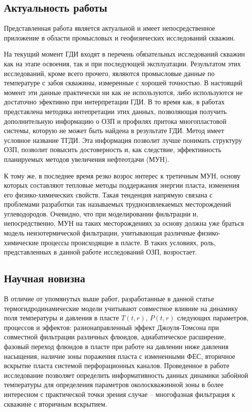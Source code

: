 \subsection*{Актуальность работы}
	Представленная работа является актуальной и имеет непосредственное приложение в области промысловых и геофизических исследований скважин.

	На текущий момент ГДИ входят в перечень обязательных исследований скважин как на этапе освоения, так и при последующей эксплуатации.
	Результатом этих исследований, кроме всего прочего, являются промысловые данные по температуре с забоя скважины, измеренные с хорошей точностью.
	В настоящий момент эти данные практически ни как не используются, либо используются не достаточно эфективно при интерпретации ГДИ.
	В то время как, в работах \cite{checkalyuk, ramazanov_old2, valiullin, ramazanov_diss, ramazanov_spe, ramazanov_spe1, posv} представлена методика интепретации этих данных, позволяющая получить дополнительную информацию о ОЗП и профилях притока многопластовой системы, которую не может быть найдена в результате ГДИ. Метод имеет условное название ТГДИ.
	Эта информация позволит лучше понимать структуру ОЗП, позволит повысить достоверность и, как следствие, эффективность планируемых методов увеличения нефтеотдачи (МУН).
	
	К тому же, в последнее время резко возрос интерес к третичным МУН, основу которых составляют тепловые методы поддержания энергии пласта, изменения его физико-химических свойств.
	Такая тенденция напрямую связана с проблемами разработки так называемых трудноизвлекаемых месторождений углеводородов.
	Очевидно, что при моделировании фильтрации и, непосредственно, МУН на таких месторождениях за основу должна уже браться модель неизотермической фильтрации, учитывающая различные физико-химические процессы происходящие в пласте.
	В таких условиях, роль, представленных в данной работе исследований ОЗП, возростает.
	
\subsection*{Научная новизна}
	В отличие от упомянутых выше работ, разработанные в данной статье термогидродинамические модели учитывают совместное влияние на динамику поля температуры и давления в пласте $T\left(t, r\right)$, $P\left(t,r\right)$ следующих параметров, процессов и эффектов: разнонаправленный эффект Джоуля-Томсона при совместной фильтрации различных флюидов, адиабатическое расширение, фазовый переход флюидов в пласте при работе на давлении ниже давления насыщения, наличие зоны поражения пласта с измененными ФЕС, вторичное вскрытие пласта системой перфорационных каналов. Проведенное в работе исследование позволяет определить информативность данных динамики забойной температуры для определения параметров околоскважинной зоны в более интересном с практической точки зрения случае – многофазная фильтрация к скважине с вторичным вскрытием.

